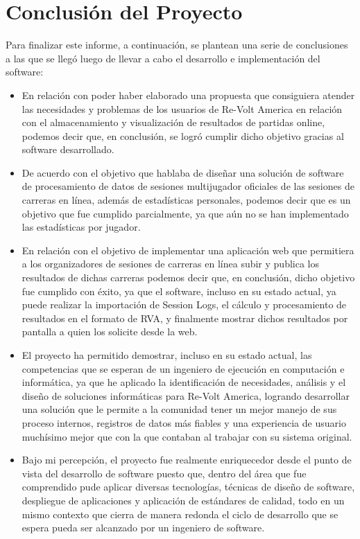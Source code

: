 \chapter{Conclusión del Proyecto}
Para finalizar este informe, a continuación, se plantean una serie de conclusiones a las que se llegó luego de llevar a cabo el desarrollo e implementación del software:

\begin{itemize}
	\item En relación con poder haber elaborado una propuesta que consiguiera atender las necesidades y problemas de los usuarios de Re-Volt America en relación con el almacenamiento y visualización de resultados de partidas online, podemos decir que, en conclusión, se logró cumplir dicho objetivo gracias al software desarrollado.
	\item De acuerdo con el objetivo que hablaba de diseñar una solución de software de procesamiento de datos de sesiones multijugador oficiales de las sesiones de carreras en línea, además de estadísticas personales, podemos decir que es un objetivo que fue cumplido parcialmente, ya que aún no se han implementado las estadísticas por jugador.
	\item En relación con el objetivo de implementar una aplicación web que permitiera a los organizadores de sesiones de carreras en línea subir y publica los resultados de dichas carreras podemos decir que, en conclusión, dicho objetivo fue cumplido con éxito, ya que el software, incluso en su estado actual, ya puede realizar la importación de Session Logs, el cálculo y procesamiento de resultados en el formato de RVA, y finalmente mostrar dichos resultados por pantalla a quien los solicite desde la web.
	\item El proyecto ha permitido demostrar, incluso en su estado actual, las competencias que se esperan de un ingeniero de ejecución en computación e informática, ya que he aplicado la identificación de necesidades, análisis y el diseño de soluciones informáticas para Re-Volt America, logrando desarrollar una solución que le permite a la comunidad tener un mejor manejo de sus proceso internos, registros de datos más fiables y una experiencia de usuario muchísimo mejor que con la que contaban al trabajar con su sistema original. 
	\item Bajo mi percepción, el proyecto fue realmente enriquecedor desde el punto de vista del desarrollo de software puesto que, dentro del área que fue comprendido pude aplicar diversas tecnologías, técnicas de diseño de software, despliegue de aplicaciones y aplicación de estándares de calidad, todo en un mismo contexto que cierra de manera redonda el ciclo de desarrollo que se espera pueda ser alcanzado por un ingeniero de software.
\end{itemize}
